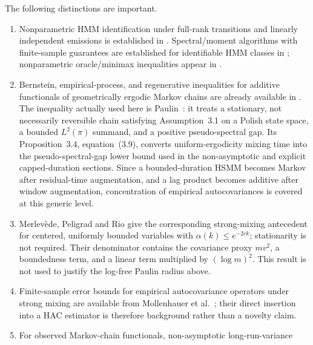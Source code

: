 \documentclass[11pt]{article}
\theoremstyle{definition}
\theoremstyle{remark}
\begin{document}
The following distinctions are important.
\begin{enumerate}
 \item Nonparametric HMM identification under full-rank transitions and
       linearly independent emissions is established in
       \cite{GassiatCleynenRobin2016}.  Spectral/moment algorithms with
       finite-sample guarantees are established for identifiable HMM classes
       in \cite{HsuKakadeZhang2012,AnandkumarHsuKakade2012}; nonparametric
       oracle/minimax inequalities appear in
       \cite{DeCastroGassiatLacour2016,AbrahamGassiatNaulet2023,AbrahamGassiatNaulet2025}.
 \item Bernstein, empirical-process, and regenerative inequalities for
       additive functionals of geometrically ergodic Markov chains are already
       available in
       \cite{Adamczak2008,AdamczakBednorz2015,BertailClemencon2010,Paulin2015}.
       The inequality actually used here is
       Paulin~\cite[Theorem~3.11, equation~(3.25), corrected author
       version]{Paulin2015}: it treats a stationary, not necessarily reversible
       chain satisfying Assumption~3.1 on a Polish state space, a bounded
       $L^2(\pi)$ summand, and a positive pseudo-spectral gap.  Its
       Proposition~3.4, equation~(3.9), converts uniform-ergodicity mixing time
       into the pseudo-spectral-gap lower bound used in the non-asymptotic and
       explicit capped-duration sections.  Since a
       bounded-duration HSMM becomes Markov after residual-time augmentation,
       and a lag product becomes additive after window augmentation,
       concentration of empirical autocovariances is covered at this generic
       level.
 \item Merlev\`ede, Peligrad and Rio
       \cite[Theorem~2]{MerlevedePeligradRio2009} give the corresponding
       strong-mixing antecedent for centered, uniformly bounded variables with
       $\alpha(k)\le e^{-2ck}$; stationarity is not required.  Their denominator
       contains the covariance proxy $mv^2$, a boundedness term, and a linear
       term multiplied by $(\log m)^2$.  This result is not used to justify the
       log-free Paulin radius above.
 \item Finite-sample error bounds for empirical autocovariance operators under
       strong mixing are available from Mollenhauer et
       al.\ \cite{MollenhauerEtAl2022}; their direct insertion into a HAC
       estimator is therefore background rather than a novelty claim.
 \item For observed Markov-chain functionals, non-asymptotic long-run-variance

\end{enumerate}
\end{document}

